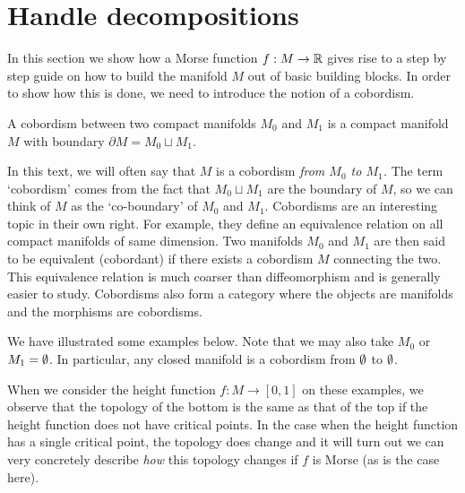 \section{Handle decompositions}
In this section we show how a Morse function $f: M \to  \mathbb{R}$ gives rise to a step by step guide on how to build the manifold $M$ out of basic building blocks.
In order to show how this is done, we need to introduce the notion of a cobordism.


\begin{definition}
A cobordism between two compact manifolds $M_0$ and $M_1$ is a compact manifold $M$  with boundary $\partial M = M_0 \sqcup M_1$.
\end{definition}

In this text, we will often say that $M$ is a cobordism \emph{from $M_0$ to $M_1$.}
The term `cobordism' comes from the fact that $M_0 \sqcup M_1$ are the boundary of $M$, so we can think of $M$ as the `co-boundary' of $M_0$ and $M_1$.
Cobordisms are an interesting topic in their own right.
For example, they define an equivalence relation on all compact manifolds of same dimension. Two manifolds $ M_0$ and $M_1$ are then said to be equivalent (cobordant) if there exists a cobordism $M$ connecting the two.
This equivalence relation is much coarser than diffeomorphism and is generally easier to study.
Cobordisms also form a category where the objects are manifolds and the morphisms are cobordisms.

We have illustrated some examples below.
Note that we may also take $M_0$ or $M_1 = \emptyset$.
In particular, any closed manifold is a cobordism from $\emptyset$ to $\emptyset$.
\begin{figure}[H]
    \centering
\end{figure}

When we consider the height function $f: M \to  [0, 1]$ on these examples,
we observe that the topology of the bottom is the same as that of the top if the height function does not have critical points.
In the case when the height function has a single critical point, the topology does change and it will turn out we can very concretely describe \emph{how} this topology changes if $f$ is Morse (as is the case here).

